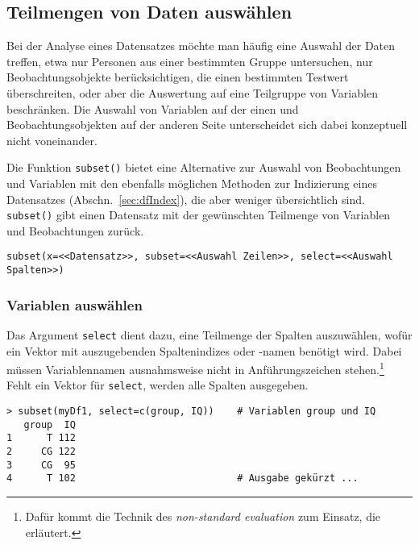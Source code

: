 \subsection{Teilmengen von Daten auswählen}
\label{sec:subset}

Bei der Analyse eines Datensatzes möchte man häufig eine Auswahl der Daten treffen, etwa nur Personen aus einer bestimmten Gruppe untersuchen, nur Beobachtungsobjekte berücksichtigen, die einen bestimmten Testwert überschreiten, oder aber die Auswertung auf eine Teilgruppe von Variablen beschränken. Die Auswahl von Variablen auf der einen und Beobachtungsobjekten auf der anderen Seite unterscheidet sich dabei konzeptuell nicht voneinander.

Die Funktion \lstinline!subset()! bietet eine Alternative zur Auswahl von Beobachtungen und Variablen mit den ebenfalls möglichen Methoden zur Indizierung eines Datensatzes (Abschn.\ \ref{sec:dfIndex}), die aber weniger übersichtlich sind. \lstinline!subset()! gibt einen Datensatz mit der gewünschten Teilmenge von Variablen und Beobachtungen zurück.
\begin{lstlisting}
subset(x=<<Datensatz>>, subset=<<Auswahl Zeilen>>, select=<<Auswahl Spalten>>)
\end{lstlisting}

\subsubsection{Variablen auswählen}

Das Argument \lstinline!select! dient dazu, eine Teilmenge der Spalten auszuwählen, wofür ein Vektor mit auszugebenden Spaltenindizes oder -namen benötigt wird. Dabei müssen Variablennamen ausnahmsweise nicht in Anführungszeichen stehen.\footnote{\label{ftn:nse}Dafür kommt die Technik des \emph{non-standard evaluation} zum Einsatz, die  erläutert.} Fehlt ein Vektor für \lstinline!select!, werden alle Spalten ausgegeben.
\begin{lstlisting}
> subset(myDf1, select=c(group, IQ))    # Variablen group und IQ
   group  IQ
1      T 112
2     CG 122
3     CG  95
4      T 102                            # Ausgabe gekürzt ...
\end{lstlisting}

